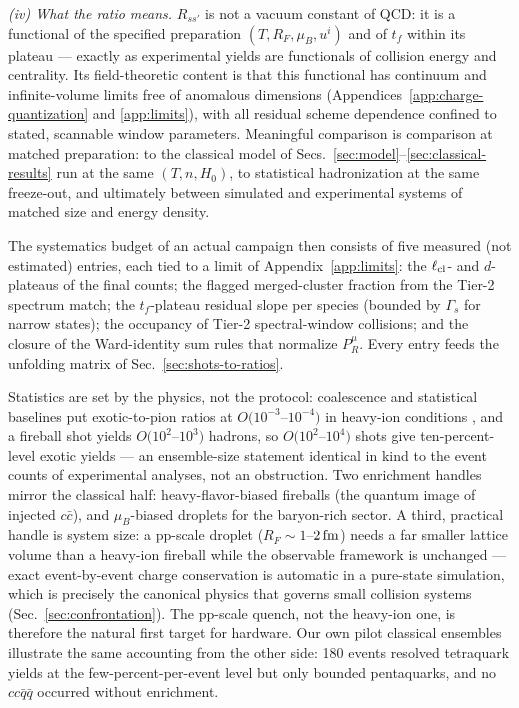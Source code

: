 \emph{(iv) What the ratio means.}  $R_{ss'}$ is not a vacuum constant
of QCD: it is a functional of the specified preparation
$(T, R_F, \mu_B, u^i)$ and of $t_f$ within its plateau --- exactly as
experimental yields are functionals of collision energy and
centrality.  Its field-theoretic content is that this functional has
continuum and infinite-volume limits free of anomalous dimensions
(Appendices~\ref{app:charge-quantization} and \ref{app:limits}),
with all residual scheme dependence confined to stated, scannable
window parameters.  Meaningful comparison is comparison at matched
preparation: to the classical model of
Secs.~\ref{sec:model}--\ref{sec:classical-results} run at the same
$(T, n, H_0)$, to statistical hadronization at the same freeze-out,
and ultimately between simulated and experimental systems of matched
size and energy density.

The systematics budget of an actual campaign then consists of five
measured (not estimated) entries, each tied to a limit of
Appendix~\ref{app:limits}: the $\ell_{\rm cl}$- and $d$-plateaus of
the final counts; the flagged merged-cluster fraction from the
Tier-2 spectrum match; the $t_f$-plateau residual slope per species
(bounded by $\Gamma_s$ for narrow states); the occupancy of Tier-2
spectral-window collisions; and the closure of the Ward-identity sum
rules that normalize $P^\mu_R$.  Every entry feeds the unfolding
matrix of Sec.~\ref{sec:shots-to-ratios}.

Statistics are set by the physics, not the protocol: coalescence and
statistical baselines put exotic-to-pion ratios at
$O(10^{-3}$--$10^{-4})$ in heavy-ion conditions
\cite{ExHIC:2010gcb,ExHIC:2017smd,Andronic:2017pug}, and a fireball shot
yields $O(10^2$--$10^3)$ hadrons, so $O(10^2$--$10^4)$ shots give
ten-percent-level exotic yields --- an ensemble-size statement identical
in kind to the event counts of experimental analyses, not an
obstruction.  Two enrichment handles mirror the classical half:
heavy-flavor-biased fireballs (the quantum image of injected $c\bar c$),
and $\mu_B$-biased droplets for the baryon-rich sector.  A third,
practical handle is system size: a pp-scale droplet ($R_F\sim1$--$2\,\mathrm{fm}$)
needs a far smaller lattice volume than a heavy-ion fireball while the
observable framework is unchanged --- exact event-by-event charge
conservation is automatic in a pure-state simulation, which is precisely
the canonical physics that governs small collision systems
(Sec.~\ref{sec:confrontation}).  The pp-scale quench, not the
heavy-ion one, is therefore the natural first target for hardware.  Our own pilot
classical ensembles illustrate the same accounting from the other side:
180 events resolved tetraquark yields at the few-percent-per-event level
but only bounded pentaquarks, and no $cc\bar q\bar q$ occurred without
enrichment.
